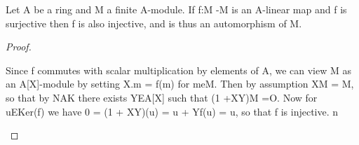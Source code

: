 \begin{theorem}[Theorem 2.4]\label{mcrt-auto-theorem-2-4}\uses{}
\begin{mathematicalrecord}
Let A be a ring and M a finite A-module. If f:M -M             is
an A-linear map and f is surjective then f is also injective, and is thus
an automorphism     of M.
\end{mathematicalrecord}
\end{theorem}
\begin{proof}
\begin{mathematicalrecord}
Since f commutes with scalar multiplication       by elements of A, we
can view M as an A[X]-module        by setting X.m = f(m) for meM. Then by
assumption XM = M, so that by NAK there exists YEA[X] such that
(1 +XY)M    =O. Now        for uEKer(f)        we have 0 = (1 + XY)(u) =
u + Yf(u) = u, so that f is injective.     n
\end{mathematicalrecord}
\end{proof}


